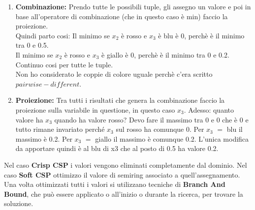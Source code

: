 \begin{enumerate}
    \item \textbf{Combinazione:} Prendo tutte le possibili tuple, gli assegno un valore e poi in base all'operatore di combinazione (che in questo caso è min) faccio la proiezione.
    \\Quindi parto cosi:
    Il minimo se $x_2$ è rosso e $x_3$ è blu è 0, perchè è il minimo tra 0 e 0.5.
    \\Il minimo se $x_2$ è rosso e $x_3$ è giallo è 0, perchè è il minimo tra 0 e 0.2.
    \\Continuo cosi per tutte le tuple.
    \\Non ho considerato le coppie di colore uguale perchè c'era scritto $pairwise-different$.
    \item \textbf{Proiezione:} Tra tutti i risultati che genera la combinazione faccio la proiezione sulla variabile in questione, in questo caso $x_3$. Adesso: quanto valore ha $x_3$ quando ha valore rosso? Devo fare il massimo tra 0 e 0 che è 0 e tutto rimane invariato perché $x_3$ sul rosso ha comunque 0. Per $x_3$ $=$ blu il massimo è 0.2. Per $x_3$ $=$ giallo il massimo è comunque 0.2. L’unica modifica da apportare quindi è al blu di x3 che al posto di 0.5 ha valore 0.2.
\end{enumerate}
Nel caso \textbf{Crisp CSP} i valori vengono eliminati completamente dal dominio. Nel caso \textbf{Soft CSP} ottimizzo il valore di semiring associato a quell’assegnamento. Una volta ottimizzati tutti i valori si utilizzano tecniche di \textbf{Branch And Bound}, che può essere applicato o all’inizio o durante la ricerca, per trovare la soluzione.
\newpage
